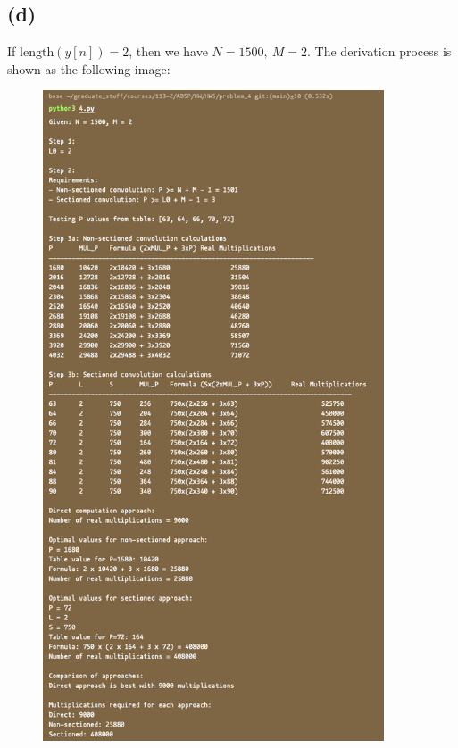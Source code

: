 \documentclass{article}
\begin{document}
\subsection*{(d)}

If $\mathrm{length}(y[n]) = 2$, then we have $N = 1500, \ M = 2$.
The derivation process is shown as the following image:

\begin{figure}[H]
    \centering
    \includegraphics[width=0.9\textwidth]{problem_4/4_d.png}
\end{figure}
\end{document}
